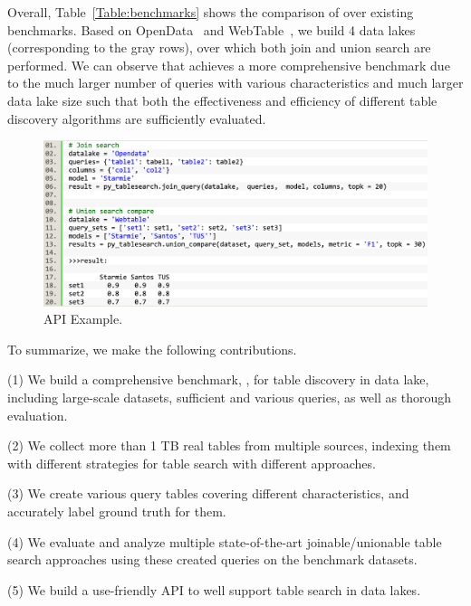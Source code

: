 Overall, Table~\ref{Table:benchmarks} shows the comparison of \sys over existing benchmarks. Based on OpenData~\cite{} and  WebTable~\cite{}, we build 4 data lakes (corresponding to the gray rows), over which  both join and union search are performed. We can observe that \sys achieves a more comprehensive benchmark due to the much larger number of queries with various characteristics and  much larger data lake size such that both the effectiveness and efficiency of different table discovery algorithms are sufficiently evaluated. 

\begin{figure}[h]
	\centering
	\includegraphics[width=\linewidth]{fig/api}
	\caption{API Example.}
	\label{fig:api}
\end{figure}

To summarize, we make the following contributions.

\noindent (1) We build a comprehensive benchmark, \sys, for table discovery in data lake, including large-scale datasets, sufficient and various queries, as well as thorough evaluation.  

\noindent (2) We collect more than 1 TB real tables from multiple sources, indexing them with different strategies for table search with different approaches.  

\noindent (3) We create various query tables covering different characteristics, and accurately label ground truth for them.

\noindent (4) We evaluate and analyze multiple state-of-the-art joinable/unionable table search approaches using these created queries on the benchmark datasets.

\noindent (5) We build a use-friendly API to well support table search in data lakes. 

